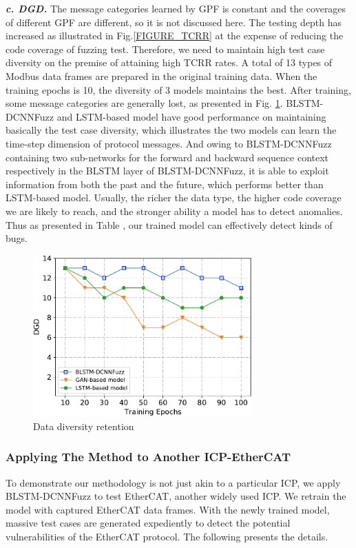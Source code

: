 \quad \textit{\textbf{c. DGD.}}
The message categories learned by GPF is constant and the coverages of different GPF are different, so it is not discussed here. The testing depth has increased as illustrated in Fig.\ref{FIGURE_TCRR} at the expense of reducing the code coverage of fuzzing test. Therefore, we need to maintain high test case diversity on the premise of attaining high TCRR rates. A total of 13 types of Modbus data frames are prepared in the original training data. When the training epochs is 10, the diversity of 3 models maintains the best. After training, some message categories are generally lost, as presented in Fig. \ref{FIGURE_DGD}. BLSTM-DCNNFuzz and LSTM-based model have good performance on maintaining basically the test case diversity, which illustrates the two models can learn the time-step dimension of protocol messages. And owing to BLSTM-DCNNFuzz containing two sub-networks for the forward and backward sequence context respectively in the BLSTM layer of BLSTM-DCNNFuzz, it is able to exploit information from both the past and the future, which performs better than LSTM-based model. Usually, the richer the data type, the higher code coverage we are likely to reach, and the stronger ability a model has to detect anomalies. Thus as presented in Table \uppercase\expandafter{}, our trained model can effectively detect kinds of bugs.

\begin{figure}[htbp]
	\centering
	\includegraphics[width=3.3in]{FIGURE_LV/FIGURE_DGD.pdf}
	\caption{Data diversity retention}
	\label{FIGURE_DGD}
\end{figure}

\subsubsection{Applying The Method to Another ICP-EtherCAT}
To demonstrate our methodology is not just akin to a particular ICP, we apply BLSTM-DCNNFuzz to test EtherCAT, another widely used ICP. We retrain the model with captured EtherCAT data frames. With the newly trained model, massive test cases are generated expediently to detect the potential vulnerabilities of the EtherCAT protocol. The following presents the details.

